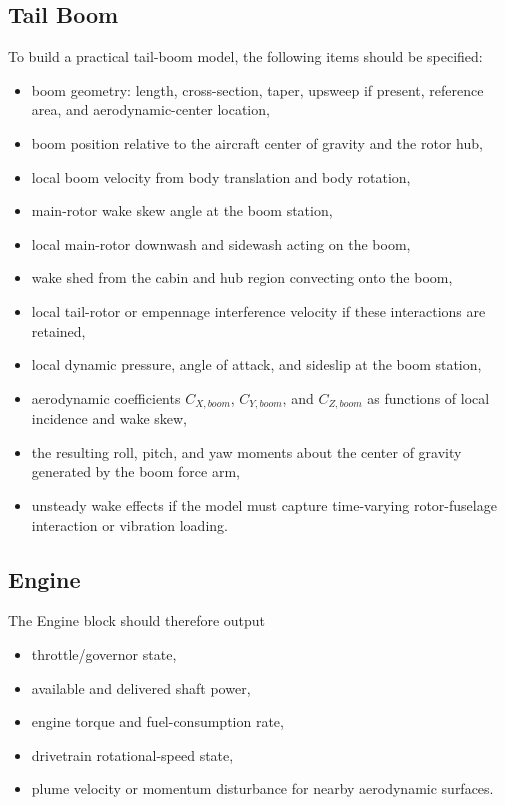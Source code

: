 \documentclass[12pt,a4paper]{article}
\begin{document}
\subsection{Tail Boom}

To build a practical tail-boom model, the following items should be specified:
\begin{itemize}
  \item boom geometry: length, cross-section, taper, upsweep if present, reference area, and aerodynamic-center location,
  \item boom position relative to the aircraft center of gravity and the rotor hub,
  \item local boom velocity from body translation and body rotation,
  \item main-rotor wake skew angle at the boom station,
  \item local main-rotor downwash and sidewash acting on the boom,
  \item wake shed from the cabin and hub region convecting onto the boom,
  \item local tail-rotor or empennage interference velocity if these interactions are retained,
  \item local dynamic pressure, angle of attack, and sideslip at the boom station,
  \item aerodynamic coefficients \(C_{X,boom}\), \(C_{Y,boom}\), and \(C_{Z,boom}\) as functions of local incidence and wake skew,
  \item the resulting roll, pitch, and yaw moments about the center of gravity generated by the boom force arm,
  \item unsteady wake effects if the model must capture time-varying rotor-fuselage interaction or vibration loading.
\end{itemize}

\subsection{Engine}

The Engine block should therefore output
\begin{itemize}
  \item throttle/governor state,
  \item available and delivered shaft power,
  \item engine torque and fuel-consumption rate,
  \item drivetrain rotational-speed state,
  \item plume velocity or momentum disturbance for nearby aerodynamic surfaces.
\end{itemize}
\end{document}
